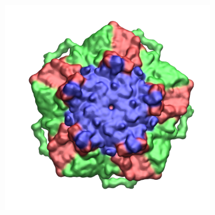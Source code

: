 \documentclass[8pt]{beamer}
\begin{document}
\begin{frame}[t]
{\begin{figure}[ht]
\begin{subfigure}[t]{.46\textwidth}
  \includegraphics[width=1\textwidth]{Figure/TrV_Pentamer_Ch4.png}
  \end{subfigure}
\hspace*{\fill}
\end{figure}
}


\end{frame}


%
%
\end{document}
